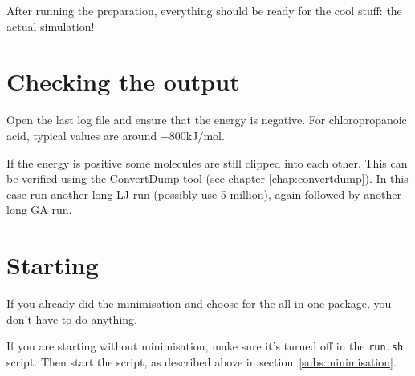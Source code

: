 
After running the preparation, everything should be ready for the cool stuff: 
the actual simulation!

\section{Checking the output}
Open the last log file and ensure that the energy is negative. For 
chloropropanoic acid, typical values are around $-800 \textrm{kJ/mol}$.

If the energy is positive some molecules are still clipped into each other. 
This can be verified using the ConvertDump tool (see chapter 
\ref{chap:convertdump}).
In this case run another long LJ run (possibly use 5 million), again followed 
by another long GA run.

\section{Starting}
If you already did the minimisation and choose for the all-in-one package, you 
don't have to do anything.

If you are starting without minimisation, make sure it's turned off in the 
\verb|run.sh| script. Then start the script, as described above in 
section~\ref{subs:minimisation}.